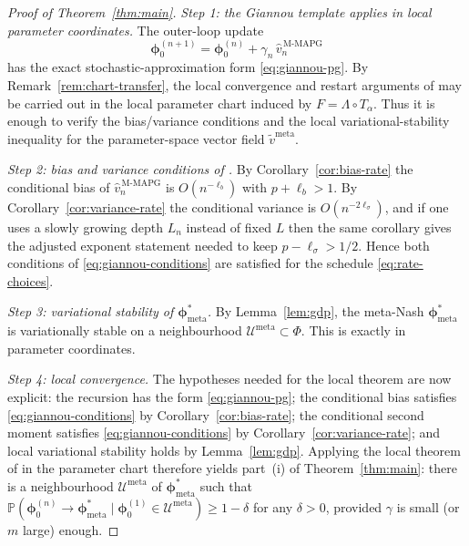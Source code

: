 \documentclass[11pt]{article}
\theoremstyle{definition}
\newcommand{\Prob}{\mathbb{P}}
\newcommand{\calU}{\mathcal{U}}
\newcommand{\meta}{\mathrm{meta}}
\newcommand{\MAPG}{\mathrm{M\text{-}MAPG}}
\begin{document}
\begin{proof}[Proof of Theorem~\ref{thm:main}]
\emph{Step 1: the Giannou template applies in local parameter coordinates.} The outer-loop update
\[\bm\phi_0^{(n+1)}=\bm\phi_0^{(n)}+\gamma_n\,\hat v_n^{\,\MAPG}\]
has the exact stochastic-approximation form \eqref{eq:giannou-pg}. By Remark~\ref{rem:chart-transfer}, the local convergence and restart arguments of \cite{Giannou2022} may be carried out in the local parameter chart induced by $F=\Lambda\circ T_\alpha$. Thus it is enough to verify the bias/variance conditions and the local variational-stability inequality for the parameter-space vector field $\widetilde v^\meta$.

\emph{Step 2: bias and variance conditions of \cite[Eq.~(2.10)]{Giannou2022}.} By Corollary~\ref{cor:bias-rate} the conditional bias of $\hat v_n^{\,\MAPG}$ is $O(n^{-\ell_b})$ with $p+\ell_b>1$. By Corollary~\ref{cor:variance-rate} the conditional variance is $O(n^{-2\ell_\sigma})$, and if one uses a slowly growing depth $L_n$ instead of fixed $L$ then the same corollary gives the adjusted exponent statement needed to keep $p-\ell_\sigma>1/2$. Hence both conditions of \eqref{eq:giannou-conditions} are satisfied for the schedule \eqref{eq:rate-choices}.

\emph{Step 3: variational stability of $\bm\phi^*_\meta$.} By Lemma~\ref{lem:gdp}, the meta-Nash $\bm\phi^*_\meta$ is variationally stable on a neighbourhood $\calU^\meta\subset\Phi$. This is exactly \cite[Def.~2]{Giannou2022} in parameter coordinates.

\emph{Step 4: local convergence.} The hypotheses needed for the local theorem are now explicit: the recursion has the form \eqref{eq:giannou-pg}; the conditional bias satisfies \eqref{eq:giannou-conditions} by Corollary~\ref{cor:bias-rate}; the conditional second moment satisfies \eqref{eq:giannou-conditions} by Corollary~\ref{cor:variance-rate}; and local variational stability holds by Lemma~\ref{lem:gdp}. Applying the local theorem of \cite{Giannou2022} in the parameter chart therefore yields part~(i) of Theorem~\ref{thm:main}: there is a neighbourhood $\calU^\meta$ of $\bm\phi^*_\meta$ such that $\Prob(\bm\phi_0^{(n)}\to\bm\phi^*_\meta\mid\bm\phi_0^{(1)}\in\calU^\meta)\ge1-\delta$ for any $\delta>0$, provided $\gamma$ is small (or $m$ large) enough.


\end{proof}
\end{document}
